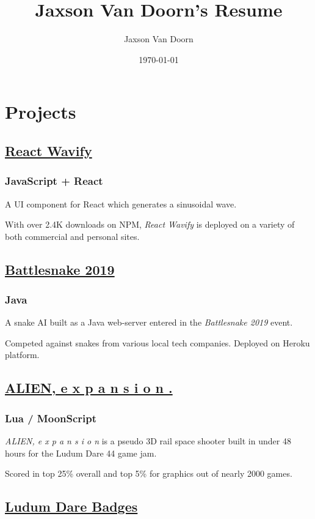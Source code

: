 \documentclass[letterpaper]{article}
\author{Jaxson Van Doorn}
\date{\today}
\title{Jaxson Van Doorn's Resume}
\begin{document}
 
\section{Projects}
\label{sec:org67a0d1d}
\subsection{\href{https://github.com/woofers/react-wavify}{React Wavify}}
\label{sec:org4376c0f}
\subsubsection{JavaScript + React}
\label{sec:org669d819}
A UI component for React which generates a sinusoidal wave.

With over 2.4K downloads on NPM, \emph{React Wavify} is deployed on a variety of both commercial and personal sites.
\subsection{\href{https://github.com/woofers/battlesnake-2019}{Battlesnake 2019}}
\label{sec:org96c0095}
\subsubsection{Java}
\label{sec:org4cdf2f6}
A snake AI built as a Java web-server entered in the \emph{Battlesnake 2019} event.

Competed against snakes from various local tech companies.  Deployed on Heroku platform.

\subsection{\href{https://github.com/woofers/ludum-dare-44}{ALIEN, e x p a n s i o n .}}
\label{sec:orgeeff32f}
\subsubsection{Lua / MoonScript}
\label{sec:org9d61d0e}
\emph{ALIEN, e x p a n s i o n} is a pseudo 3D rail space shooter built in under 48 hours for the Ludum Dare 44 game jam.

Scored in top 25\% overall and top 5\% for graphics out of nearly 2000 games.

\subsection{\href{https://github.com/woofers/ludum-dare-badges}{Ludum Dare Badges}}
\label{sec:orgaae4777}
\end{document}
